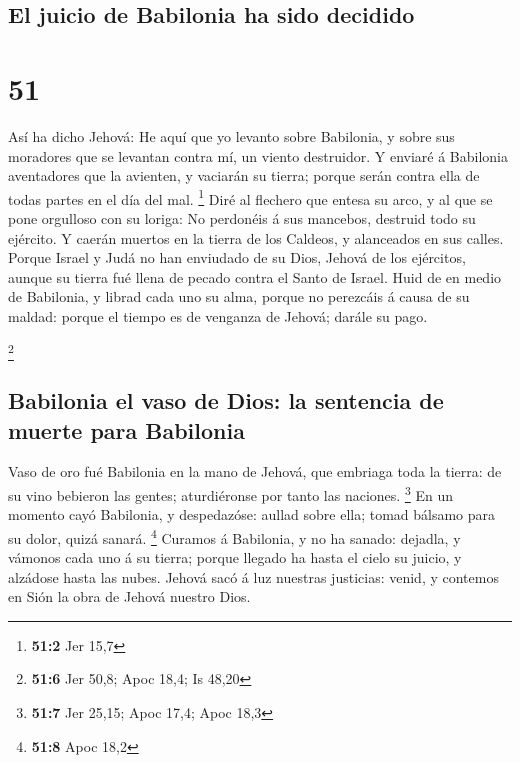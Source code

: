 \hypertarget{el-juicio-de-babilonia-ha-sido-decidido}{%
\subsection{El juicio de Babilonia ha sido
decidido}\label{el-juicio-de-babilonia-ha-sido-decidido}}

\hypertarget{section-50}{%
\section{51}\label{section-50}}

 Así ha dicho Jehová: He aquí que yo levanto sobre
Babilonia, y sobre sus moradores que se levantan contra mí, un viento
destruidor.  Y enviaré á Babilonia aventadores que la
avienten, y vaciarán su tierra; porque serán contra ella de todas partes
en el día del mal. \footnote{\textbf{51:2} Jer 15,7}  Diré
al flechero que entesa su arco, y al que se pone orgulloso con su
loriga: No perdonéis á sus mancebos, destruid todo su ejército.
 Y caerán muertos en la tierra de los Caldeos, y alanceados
en sus calles.  Porque Israel y Judá no han enviudado de su
Dios, Jehová de los ejércitos, aunque su tierra fué llena de pecado
contra el Santo de Israel.  Huid de en medio de Babilonia, y
librad cada uno su alma, porque no perezcáis á causa de su maldad:
porque el tiempo es de venganza de Jehová; darále su pago.

\footnote{\textbf{51:6} Jer 50,8; Apoc 18,4; Is 48,20}

\hypertarget{babilonia-el-vaso-de-dios-la-sentencia-de-muerte-para-babilonia}{%
\subsection{Babilonia el vaso de Dios: la sentencia de muerte para
Babilonia}\label{babilonia-el-vaso-de-dios-la-sentencia-de-muerte-para-babilonia}}

 Vaso de oro fué Babilonia en la mano de Jehová, que
embriaga toda la tierra: de su vino bebieron las gentes; aturdiéronse
por tanto las naciones. \footnote{\textbf{51:7} Jer 25,15; Apoc 17,4;
  Apoc 18,3}  En un momento cayó Babilonia, y despedazóse:
aullad sobre ella; tomad bálsamo para su dolor, quizá sanará.
\footnote{\textbf{51:8} Apoc 18,2}  Curamos á Babilonia, y
no ha sanado: dejadla, y vámonos cada uno á su tierra; porque llegado ha
hasta el cielo su juicio, y alzádose hasta las nubes. 
Jehová sacó á luz nuestras justicias: venid, y contemos en Sión la obra
de Jehová nuestro Dios.

